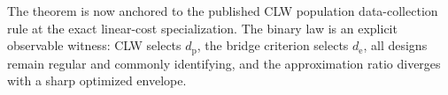The theorem is now anchored to the published CLW population data-collection rule at the exact linear-cost specialization. The binary law is an explicit observable witness: CLW selects \(d_{\mathrm p}\), the bridge criterion selects \(d_{\mathrm e}\), all designs remain regular and commonly identifying, and the approximation ratio diverges with a sharp optimized envelope.